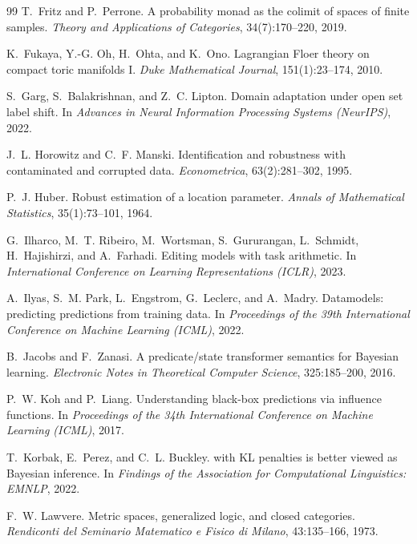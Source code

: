 \documentclass[11pt]{article}
\theoremstyle{definition}
\theoremstyle{remark}
\begin{document}
\begin{thebibliography}{99}
T.~Fritz and P.~Perrone.
\newblock A probability monad as the colimit of spaces of finite samples.
\newblock \emph{Theory and Applications of Categories}, 34(7):170--220, 2019.

K.~Fukaya, Y.-G. Oh, H.~Ohta, and K.~Ono.
\newblock Lagrangian {F}loer theory on compact toric manifolds {I}.
\newblock \emph{Duke Mathematical Journal}, 151(1):23--174, 2010.

S.~Garg, S.~Balakrishnan, and Z.~C. Lipton.
\newblock Domain adaptation under open set label shift.
\newblock In \emph{Advances in Neural Information Processing Systems (NeurIPS)}, 2022.

J.~L. Horowitz and C.~F. Manski.
\newblock Identification and robustness with contaminated and corrupted data.
\newblock \emph{Econometrica}, 63(2):281--302, 1995.

P.~J. Huber.
\newblock Robust estimation of a location parameter.
\newblock \emph{Annals of Mathematical Statistics}, 35(1):73--101, 1964.

G.~Ilharco, M.~T. Ribeiro, M.~Wortsman, S.~Gururangan, L.~Schmidt, H.~Hajishirzi, and A.~Farhadi.
\newblock Editing models with task arithmetic.
\newblock In \emph{International Conference on Learning Representations (ICLR)}, 2023.

A.~Ilyas, S.~M. Park, L.~Engstrom, G.~Leclerc, and A.~Madry.
\newblock Datamodels: predicting predictions from training data.
\newblock In \emph{Proceedings of the 39th International Conference on Machine Learning (ICML)}, 2022.

B.~Jacobs and F.~Zanasi.
\newblock A predicate/state transformer semantics for {B}ayesian learning.
\newblock \emph{Electronic Notes in Theoretical Computer Science}, 325:185--200, 2016.

P.~W. Koh and P.~Liang.
\newblock Understanding black-box predictions via influence functions.
\newblock In \emph{Proceedings of the 34th International Conference on Machine Learning (ICML)}, 2017.

T.~Korbak, E.~Perez, and C.~L. Buckley.
 with {KL} penalties is better viewed as {B}ayesian inference.
\newblock In \emph{Findings of the Association for Computational Linguistics: EMNLP}, 2022.

F.~W. Lawvere.
\newblock Metric spaces, generalized logic, and closed categories.
\newblock \emph{Rendiconti del Seminario Matematico e Fisico di Milano}, 43:135--166, 1973.


\end{thebibliography}
\end{document}
